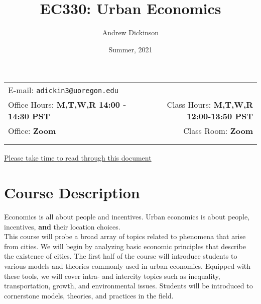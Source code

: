 \documentclass[11pt]{article}
\title{EC330: Urban Economics}
\author{Andrew Dickinson}
\date{Summer, 2021}
\newcommand{\blankline}{\quad\pagebreak[2]}
\begin{document}
	
	\maketitle
	
	\blankline
	
	\begin{tabular*}{.93\textwidth}{@{\extracolsep{\fill}}lr}
		
		
		E-mail: \texttt{adickin3@uoregon.edu}  \\
		
		Office Hours: \textbf{M,T,W,R 14:00 - 14:30 PST}  &  Class Hours:  \textbf{M,T,W,R 12:00-13:50 PST} \\
		
		Office: \textbf{Zoom} & Class Room: \textbf{Zoom}\\

		&\\
		\hline
		\\
	\end{tabular*}
	
	\href{https://www.youtube.com/watch?v=aOIvB2YtAhY}{Please take time to read through this document}
	
	\vspace{5 mm}
	
	
	\section*{Course Description}
		
	Economics is all about people and incentives. Urban economics is about people, incentives, \textbf{and} their location choices. \\
	
	\noindent This course will probe a broad array of topics related to phenomena that arise from cities. We will begin by analyzing basic economic principles that describe the existence of cities. The first half of the course will introduce students to various models and theories commonly used in urban economics. Equipped with these tools,  we will cover intra- and intercity topics such as inequality, transportation, growth, and environmental issues. Students will be introduced to cornerstone models, theories, and practices in the field.
	
\end{document}
